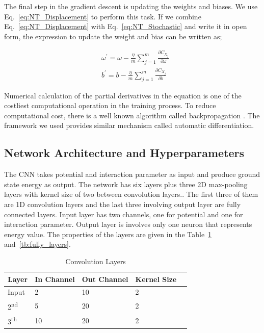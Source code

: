 \documentclass[a4paper,times,hidelinks,12pt]{article}
\begin{document}
The final step in the gradient descent is updating the weights and biases. We use Eq.~\eqref{eq:NT_Displacement} to perform this task. If we combine Eq.~\eqref{eq:NT_Displacement} with Eq.~\eqref{eq:NT_Stochastic} and write it in open form, the expression to update the weight and bias can be written as;

\begin{equation}
\label{eq:NT_weight_bias_update}
\begin{split}
& \omega^{\prime} = \omega - \frac{\eta}{m} \sum\limits_{j = 1}^{m} \frac{\partial{C_{X_j}}}{\partial{\omega}} \\
& b^{\prime} = b- \frac{\eta}{m} \sum\limits_{j = 1}^{m} \frac{\partial{C_{X_j}}}{\partial{b}}
\end{split}
\end{equation}

\noindent Numerical calculation of the partial derivatives in the equation is one of the costliest computational operation in the training process. To reduce computational cost, there is a well known algorithm called backpropagation \cite{goodfellow2016deep}. The framework we used provides similar mechanism called automatic differentiation. 

\subsection{Network Architecture and Hyperparameters}

The CNN takes potential and interaction parameter as input and produce ground state energy as output. The network has six layers plus three 2D max-pooling layers with kernel size of two between convolution layers.. The first three of them are 1D convolution layers and the last three involving output layer are fully connected layers. Input layer has two channels, one for potential and one for interaction parameter. Output layer is involves only one neuron that represents energy value. The properties of the layers are given in the Table~\ref{tb:conv_layers} and~\ref{tb:fully_layers}.

\begin{table}[H]
    \centering
    \caption{Convolution Layers}
    \label{tb:conv_layers}
    \begin{tabular}{|l|l|l|l|l|} \hline
    \textbf{Layer}        & \textbf{In Channel} & \textbf{Out Channel}   & \textbf{Kernel Size}  \\ \hline
    Input                 & 2                   & 10                     & 2                     \\ \hline
    2\textsuperscript{nd} & 5                   & 20                     & 2                     \\ \hline
    3\textsuperscript{th} & 10                  & 20                     & 2                     \\ \hline
    \end{tabular}
\end{table}
\end{document}
